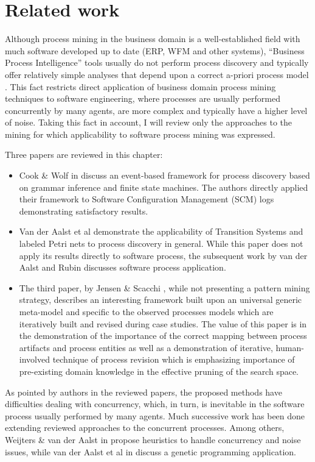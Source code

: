 \chapter{Related work} \label{related.work}
Although process mining in the business domain is a well-established field with much software developed up to date (ERP, WFM and other systems), ``Business Process Intelligence'' tools usually do not perform process discovery and typically offer relatively simple analyses that depend upon a correct a-priori process model \cite{citeulike:3718014} \cite{citeulike:5044991}. This fact restricts direct application of business domain process mining techniques to software engineering, where processes are usually performed concurrently by many agents, are more complex and typically have a higher level of noise. Taking this fact in account, I will review only the approaches to the mining for which applicability to software process mining was expressed. 

Three papers are reviewed in this chapter: 
\begin{itemize}
	\item Cook \& Wolf in \cite{citeulike:328044} discuss an event-based framework for process discovery based on grammar inference and finite state machines. The authors directly applied their framework to Software Configuration Management (SCM) logs demonstrating satisfactory results. 
	\item Van der Aalst et al \cite{citeulike:3718014} demonstrate the applicability of Transition Systems and labeled Petri nets to process discovery in general. While this paper does not apply its results directly to software process, the subsequent work by van der Aalst and Rubin \cite{citeulike:1885717} discusses software process application.
	\item The third paper, by Jensen \& Scacchi \cite{citeulike:5043664}, while not presenting a pattern mining strategy, describes an interesting framework built upon an universal generic meta-model and specific to the observed processes models which are iteratively built and revised during case studies. The value of this paper is in the demonstration of the importance of the correct mapping between process artifacts and process entities as well as a demonstration of iterative, human-involved technique of process revision which is emphasizing importance of pre-existing domain knowledge in the effective pruning of the search space.
\end{itemize}
As pointed by authors in the reviewed papers, the proposed methods have difficulties dealing with concurrency, which, in turn, is inevitable in the software process usually performed by many agents. Much successive work has been done extending reviewed approaches to the concurrent processes. Among others, Weijters \& van der Aalst in \cite{citeulike:5128101} propose heuristics to handle concurrency and noise issues, while van der Aalst et al in \cite{citeulike:5128110} discuss a genetic programming application. 
